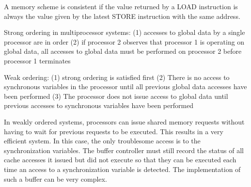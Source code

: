 \documentclass[a4paper,twoside]{scrbook}
\begin{document}
\par
A memory scheme is consistent if the value returned by a LOAD instruction is always the value given by the latest STORE instruction with the same address.
\par
Strong ordering in multiprocessor systems: (1) accesses to global data by a single processor are in order (2) if processor 2 observes that processor 1 is operating on global data, all accesses to global data must be performed on processor 2 before processor 1 terminates
\par
Weak ordering: (1) strong ordering is satisfied first (2) There is no access to synchronous variables in the processor until all previous global data accesses have been performed (3) The processor does not issue access to global data until previous accesses to synchronous variables have been performed
\par
In weakly ordered systems, processors can issue shared memory requests without having to wait for previous requests to be executed. This results in a very efficient system. In this case, the only troublesome access is to the synchronization variables. The buffer controller must still record the status of all cache accesses it issued but did not execute so that they can be executed each time an access to a synchronization variable is detected. The implementation of such a buffer can be very complex.
\end{document}
